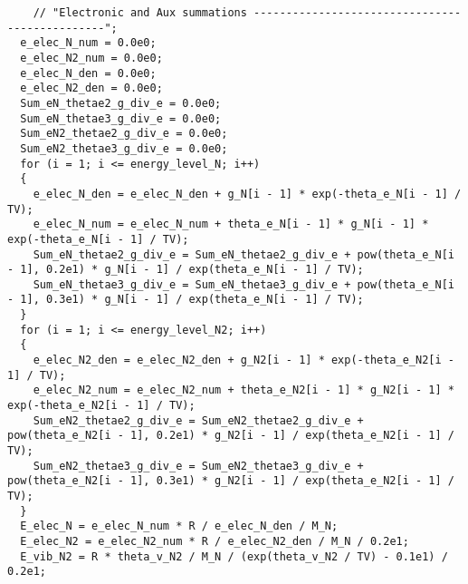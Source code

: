 \documentclass[10pt]{article}
\begin{document}
\begin{scriptsize}
\begin{verbatim}
    // "Electronic and Aux summations -----------------------------------------------";
  e_elec_N_num = 0.0e0;
  e_elec_N2_num = 0.0e0;
  e_elec_N_den = 0.0e0;
  e_elec_N2_den = 0.0e0;
  Sum_eN_thetae2_g_div_e = 0.0e0;
  Sum_eN_thetae3_g_div_e = 0.0e0;
  Sum_eN2_thetae2_g_div_e = 0.0e0;
  Sum_eN2_thetae3_g_div_e = 0.0e0;
  for (i = 1; i <= energy_level_N; i++)
  {
    e_elec_N_den = e_elec_N_den + g_N[i - 1] * exp(-theta_e_N[i - 1] / TV);
    e_elec_N_num = e_elec_N_num + theta_e_N[i - 1] * g_N[i - 1] * exp(-theta_e_N[i - 1] / TV);
    Sum_eN_thetae2_g_div_e = Sum_eN_thetae2_g_div_e + pow(theta_e_N[i - 1], 0.2e1) * g_N[i - 1] / exp(theta_e_N[i - 1] / TV);
    Sum_eN_thetae3_g_div_e = Sum_eN_thetae3_g_div_e + pow(theta_e_N[i - 1], 0.3e1) * g_N[i - 1] / exp(theta_e_N[i - 1] / TV);
  }
  for (i = 1; i <= energy_level_N2; i++)
  {
    e_elec_N2_den = e_elec_N2_den + g_N2[i - 1] * exp(-theta_e_N2[i - 1] / TV);
    e_elec_N2_num = e_elec_N2_num + theta_e_N2[i - 1] * g_N2[i - 1] * exp(-theta_e_N2[i - 1] / TV);
    Sum_eN2_thetae2_g_div_e = Sum_eN2_thetae2_g_div_e + pow(theta_e_N2[i - 1], 0.2e1) * g_N2[i - 1] / exp(theta_e_N2[i - 1] / TV);
    Sum_eN2_thetae3_g_div_e = Sum_eN2_thetae3_g_div_e + pow(theta_e_N2[i - 1], 0.3e1) * g_N2[i - 1] / exp(theta_e_N2[i - 1] / TV);
  }
  E_elec_N = e_elec_N_num * R / e_elec_N_den / M_N;
  E_elec_N2 = e_elec_N2_num * R / e_elec_N2_den / M_N / 0.2e1;
  E_vib_N2 = R * theta_v_N2 / M_N / (exp(theta_v_N2 / TV) - 0.1e1) / 0.2e1;


\end{verbatim}
\end{scriptsize}
\end{document}
